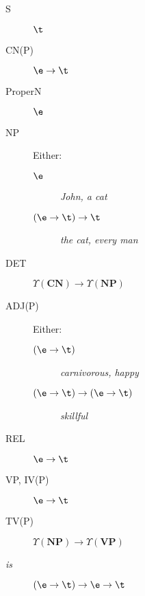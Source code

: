 \begin{description}
	\item[S] $\t$
	\item[CN(P)] $\e\to \t$
	\item[ProperN] $\e$
	\item[NP] Either:
	      \begin{description}
		      \item[$\e$] \textsl{John, a cat}
		      \item[$\left(\e\to\t\right) \to \t$] \textsl{the cat, every man}
	      \end{description}
	\item[DET] $\Upsilon\left( \mathbf{CN} \right) \to \Upsilon\left( \mathbf{NP} \right)$
	\item[ADJ(P)] Either:
	      \begin{description}
		      \item[$\left( \e \to \t \right)$] \textsl{carnivorous, happy}
		      \item[$\left( \e \to \t \right) \to \left( \e \to \t \right)$] \textsl{skillful}
	      \end{description}
	\item[REL] $\e \to \t$
	\item[VP, IV(P)] $\e \to \t$
	\item[TV(P)] $\Upsilon\left( \mathbf{NP} \right) \to \Upsilon\left( \mathbf{VP }\right)$
	\item[\it is] $\left( \e \to \t \right) \to \e \to \t$
\end{description}
